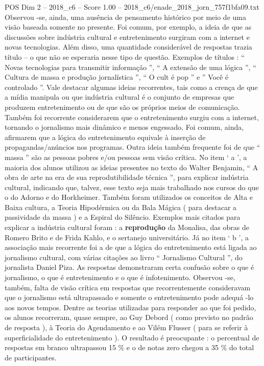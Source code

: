 \begin{textsample}{POS Dim 2 – 2018\_c6 – Score 1.00 – 2018\_c6/enade\_2018\_jorn\_757f1bfa09.txt}
Observou -se, ainda, uma ausência de pensamento histórico por meio de uma visão baseada somente no presente.
Foi comum, por exemplo, a ideia de que as discussões sobre indústria cultural e entretenimento surgiram com a internet e novas tecnologias.
Além disso, uma quantidade considerável de respostas trazia título – o que não se esperaria nesse tipo de questão.
Exemplos de títulos : “ Novas tecnologias para transmitir informação ”, “ A extensão de uma lógica ”, “ Cultura de massa e produção jornalística ”, “ O cult é pop ” e ” Você é controlado ”.
Vale destacar algumas ideias recorrentes, tais como a crença de que a mídia manipula ou que indústria cultural é o conjunto de empresas que produzem entretenimento ou de que são os próprios meios de comunicação.
Também foi recorrente considerarem que o entretenimento surgiu com a internet, tornando o jornalismo mais dinâmico e menos engessado.
Foi comum, ainda, afirmarem que a lógica do entretenimento equivale à inserção de propagandas/anúncios nos programas.
Outra ideia também frequente foi de que “ massa ” são as pessoas pobres e/ou pessoas sem visão crítica.
No item ‘ a ’, a maioria dos alunos utilizou as ideias presentes no texto do Walter Benjamin, “ A obra de arte na era de sua reprodutibilidade técnica ”, para explicar indústria cultural, indicando que, talvez, esse texto seja mais trabalhado nos cursos do que o do Adorno e do Horkheimer.
Também foram utilizados os conceitos de Alta e Baixa cultura, a Teoria Hipodérmica ou da Bala Mágica ( para destacar a passividade da massa ) e a Espiral do Silêncio.
Exemplos mais citados para explicar a indústria cultural foram : a \textbf{reprodução} da Monalisa, das obras de Romero Brito e de Frida Kahlo, e o sertanejo universitário.
Já no item ‘ b ’, a associação mais recorrente foi a de que a lógica do entretenimento está ligada ao jornalismo cultural, com várias citações ao livro “ Jornalismo Cultural ”, do jornalista Daniel Piza.
As respostas demonstraram certa confusão sobre o que é jornalismo, o que é entretenimento e o que é infotenimento.
Observou -se, também, falta de visão crítica em respostas que recorrentemente consideravam que o jornalismo está ultrapassado e somente o entretenimento pode adequá -lo aos novos tempos.
Dentre as teorias utilizadas para responder ao que foi pedido, os alunos recorreram, quase sempre, ao Guy Debord ( como previsto no padrão de resposta ), à Teoria do Agendamento e ao Vilém Flusser ( para se referir à superficialidade do entretenimento ).
O resultado é preocupante : o percentual de respostas em branco ultrapassou 15 \% e o de notas zero chegou a 35 \% do total de participantes.

\end{textsample}
